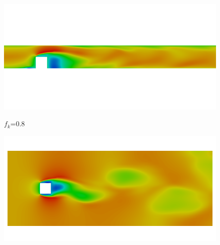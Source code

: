 \begin{figure}[H]
\begin{minipage}[b]{0.5\linewidth}
\includegraphics[scale=0.25]{figure/coarse/eight/Umag_z.png}
\caption*{$f_k$=0.8}
\end{minipage}
\begin{minipage}[b]{0.5\linewidth}
\includegraphics[scale=0.25]{figure/coarse/eight/Umag_y.png}
\caption*{}
\end{minipage}\\
\label{fig:eight}
\end{figure}
\newpage
